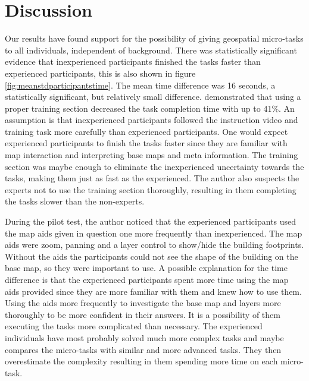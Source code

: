 \chapter{Discussion}
Our results have found support for the possibility of giving geospatial micro-tasks to all individuals, independent of background. There was statistically significant evidence that inexperienced participants finished the tasks faster than experienced participants, this is also shown in figure \ref{fig:meanstdparticipantstime}. The mean time difference was 16 seconds, a statistically significant, but relatively small difference. \cite{Gadiraju2015a} demonstrated that using a proper training section decreased the task completion time with up to 41\%. An assumption is that inexperienced participants followed the instruction video and training task more carefully than experienced participants. One would expect experienced participants to finish the tasks faster since they are familiar with map interaction and interpreting base maps and meta information. The training section was maybe enough to eliminate the inexperienced uncertainty towards the tasks, making them just as fast as the experienced. The author also suspects the experts not to use the training section thoroughly, resulting in them completing the tasks slower than the non-experts. 

During the pilot test, the author noticed that the experienced participants used the map aids given in question one more frequently than inexperienced. The map aids were zoom, panning and a layer control to show/hide the building footprints. Without the aids the participants could not see the shape of the building on the base map, so they were important to use. A possible explanation for the time difference is that the experienced participants spent more time using the map aids provided since they are more familiar with them and knew how to use them. Using the aids more frequently to investigate the base map and layers more thoroughly to be more confident in their answers. It is a possibility of them executing the tasks more complicated than necessary. The experienced individuals have most probably solved much more complex tasks and maybe compares the micro-tasks with similar and more advanced tasks. They then overestimate the complexity resulting in them spending more time on each micro-task.

